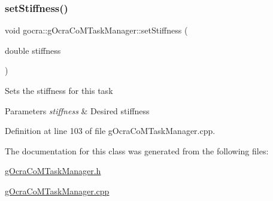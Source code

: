 \subsubsection{\texorpdfstring{set\+Stiffness()}{setStiffness()}}
{\footnotesize\ttfamily void gocra\+::g\+Ocra\+Co\+M\+Task\+Manager\+::set\+Stiffness (\begin{DoxyParamCaption}\item[{double}]{stiffness }\end{DoxyParamCaption})}

Sets the stiffness for this task


\begin{DoxyParams}{Parameters}
{\em stiffness} & Desired stiffness \\
\hline
\end{DoxyParams}


Definition at line 103 of file g\+Ocra\+Co\+M\+Task\+Manager.\+cpp.



The documentation for this class was generated from the following files\+:\begin{DoxyCompactItemize}
\item 
\hyperlink{gOcraCoMTaskManager_8h}{g\+Ocra\+Co\+M\+Task\+Manager.\+h}\item 
\hyperlink{gOcraCoMTaskManager_8cpp}{g\+Ocra\+Co\+M\+Task\+Manager.\+cpp}\end{DoxyCompactItemize}
